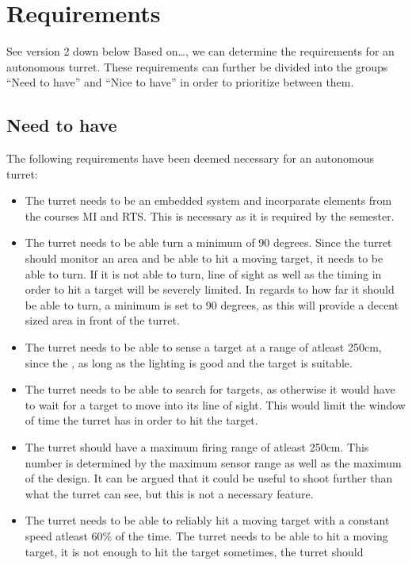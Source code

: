 \section{Requirements}
See version 2 down below
Based on\ldots, we can determine the requirements for an autonomous
turret.
These requirements can further be divided into the groups ``Need to have'' and
``Nice to have'' in order to prioritize between them.

\subsection{Need to have}
The following requirements have been deemed necessary for an autonomous turret:
\begin{itemize}
  \item The turret needs to be an embedded system and incorparate elements from
  the courses MI and RTS. This is necessary as it is required by the semester.
  \item The turret needs to be able turn a minimum of 90 degrees. Since the
  turret should monitor an area and be able to hit a moving target, it needs to
  be able to turn. If it is not able to turn, line of sight as well as the
  timing in order to hit a target will be severely limited. In regards to how
  far it should be able to turn, a minimum is set to 90 degrees, as this will
  provide a decent sized area in front of the turret.
  \item The turret needs to be able to sense a target at a range of atleast
  250cm, since the , as long as the
  lighting is good and the target is suitable.
  \item The turret needs to be able to search for targets, as otherwise it would
  have to wait for a target to move into its line of sight. This would limit
  the window of time the turret has in order to hit the target.
  \item The turret should have a maximum firing range of atleast 250cm. This
  number is determined by the maximum sensor range as well as the maximum of
  the design. It can be argued that it could be useful to shoot further than
  what the turret can see, but this is not a necessary feature.
  \item The turret needs to be able to reliably hit a moving target with a
  constant speed atleast 60\% of the time. The turret needs to be able to hit a
  moving target, it is not enough to hit the target sometimes, the turret should

\end{itemize}
